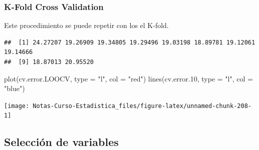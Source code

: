 \documentclass[
  12pt,
]{book}
\newenvironment{Shaded}{\begin{snugshade}}{\end{snugshade}}
\newcommand{\AttributeTok}[1]{\textcolor[rgb]{0.77,0.63,0.00}{#1}}
\newcommand{\ControlFlowTok}[1]{\textcolor[rgb]{0.13,0.29,0.53}{\textbf{#1}}}
\newcommand{\DecValTok}[1]{\textcolor[rgb]{0.00,0.00,0.81}{#1}}
\newcommand{\FloatTok}[1]{\textcolor[rgb]{0.00,0.00,0.81}{#1}}
\newcommand{\FunctionTok}[1]{\textcolor[rgb]{0.00,0.00,0.00}{#1}}
\newcommand{\NormalTok}[1]{#1}
\newcommand{\OtherTok}[1]{\textcolor[rgb]{0.56,0.35,0.01}{#1}}
\newcommand{\SpecialCharTok}[1]{\textcolor[rgb]{0.00,0.00,0.00}{#1}}
\newcommand{\StringTok}[1]{\textcolor[rgb]{0.31,0.60,0.02}{#1}}
\theoremstyle{definition}
\theoremstyle{definition}
\theoremstyle{definition}
\theoremstyle{definition}
\theoremstyle{remark}
\begin{document}
\hypertarget{k-fold-cross-validation}{%
\subsubsection{K-Fold Cross Validation}\label{k-fold-cross-validation}}

Este procedimiento se puede repetir con los el K-fold.

\begin{Shaded}
\end{Shaded}

\begin{verbatim}
##  [1] 24.27207 19.26909 19.34805 19.29496 19.03198 18.89781 19.12061 19.14666
##  [9] 18.87013 20.95520
\end{verbatim}

\begin{Shaded}
\begin{Highlighting}[]
\FunctionTok{plot}\NormalTok{(cv.error.LOOCV, }\AttributeTok{type =} \StringTok{"l"}\NormalTok{, }\AttributeTok{col =} \StringTok{"red"}\NormalTok{)}
\FunctionTok{lines}\NormalTok{(cv.error}\FloatTok{.10}\NormalTok{, }\AttributeTok{type =} \StringTok{"l"}\NormalTok{, }\AttributeTok{col =} \StringTok{"blue"}\NormalTok{)}
\end{Highlighting}
\end{Shaded}

\begin{center}\texttt{[image: Notas-Curso-Estadistica\_files/figure-latex/unnamed-chunk-208-1]} \end{center}

\hypertarget{selecciuxf3n-de-variables-1}{%
\subsection{Selección de variables}\label{selecciuxf3n-de-variables-1}}
\end{document}
